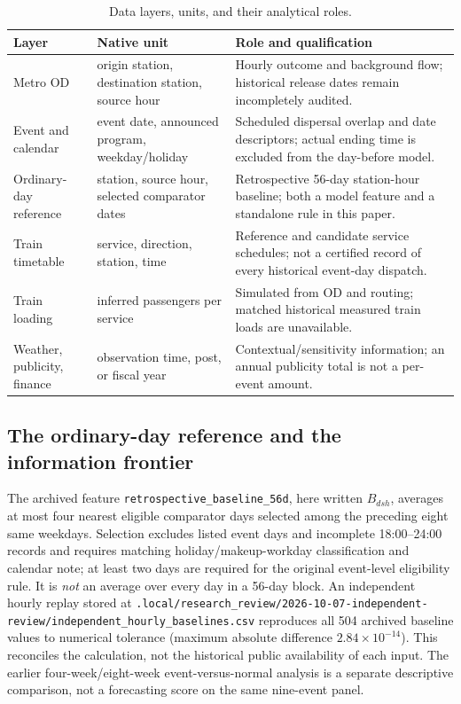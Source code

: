 \begin{table}[htbp]\centering\small
\caption{Data layers, units, and their analytical roles.}
\label{tab:data}
\begin{tabularx}{\linewidth}{p{32mm}p{42mm}X}\toprule
Layer & Native unit & Role and qualification\\\midrule
Metro OD & origin station, destination station, source hour & Hourly outcome and background flow; historical release dates remain incompletely audited.\\
Event and calendar & event date, announced program, weekday/holiday & Scheduled dispersal overlap and date descriptors; actual ending time is excluded from the day-before model.\\
Ordinary-day reference & station, source hour, selected comparator dates & Retrospective 56-day station-hour baseline; both a model feature and a standalone rule in this paper.\\
Train timetable & service, direction, station, time & Reference and candidate service schedules; not a certified record of every historical event-day dispatch.\\
Train loading & inferred passengers per service & Simulated from OD and routing; matched historical measured train loads are unavailable.\\
Weather, publicity, finance & observation time, post, or fiscal year & Contextual/sensitivity information; an annual publicity total is not a per-event amount.\\\bottomrule
\end{tabularx}
\end{table}

\subsection{The ordinary-day reference and the information frontier}
The archived feature \texttt{retrospective\_baseline\_56d}, here written $B_{dsh}$, averages at most four nearest eligible comparator days selected among the preceding eight same weekdays. Selection excludes listed event days and incomplete 18:00--24:00 records and requires matching holiday/makeup-workday classification and calendar note; at least two days are required for the original event-level eligibility rule. It is \emph{not} an average over every day in a 56-day block. An independent hourly replay stored at \texttt{.local/research\_review/2026-10-07-independent-review/independent\_hourly\_baselines.csv} reproduces all 504 archived baseline values to numerical tolerance (maximum absolute difference $2.84\times10^{-14}$). This reconciles the calculation, not the historical public availability of each input. The earlier four-week/eight-week event-versus-normal analysis is a separate descriptive comparison, not a forecasting score on the same nine-event panel.

